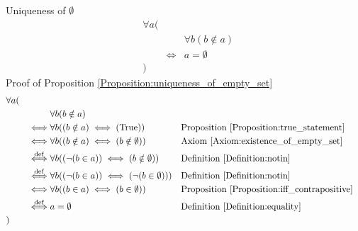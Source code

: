 \begin{prop}
\label{Proposition:uniqueness_of_empty_set}
Uniqueness of $\emptyset$
\begin{align*}
& \forall a ( \\
& & & \forall b (b \notin a) \\
& & \iff & a = \emptyset \\
& )
\end{align*}
Proof of Proposition \ref{Proposition:uniqueness_of_empty_set}
\begin{align*}
& \forall a ( \\
& & & \forall b (b \notin a) \\
& & \iff & \forall b ((b \notin a) \iff (\text{True}))
&& \text{Proposition \ref{Proposition:true_statement}} \\
& & \iff & \forall b ((b \notin a) \iff (b \notin \emptyset))
&& \text{Axiom \ref{Axiom:existence_of_empty_set}} \\
& & \overset{\operatorname{def}}{\iff} & \forall b ((\lnot (b \in a)) \iff (b \notin \emptyset))
&& \text{Definition \ref{Definition:notin}} \\
& & \overset{\operatorname{def}}{\iff} & \forall b ((\lnot (b \in a)) \iff (\lnot (b \in \emptyset)))
&& \text{Definition \ref{Definition:notin}} \\
& & \iff & \forall b ((b \in a) \iff (b \in \emptyset))
&& \text{Proposition \ref{Proposition:iff_contrapositive}} \\
& & \overset{\operatorname{def}}{\iff} & a = \emptyset
&& \text{Definition \ref{Definition:equality}} \\
& )
\end{align*}
\end{prop}

